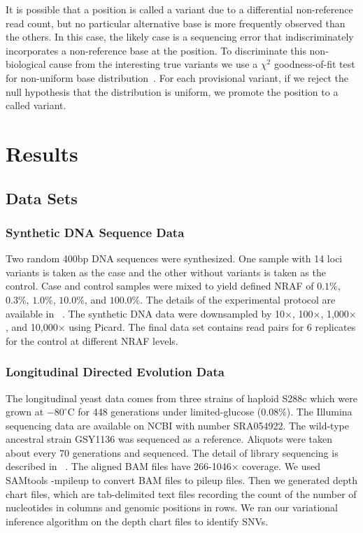 \documentclass[11pt,reqno]{amsart}
\begin{document}
It is possible that a position is called a variant due to a differential non-reference read count, but no particular alternative base is more frequently observed than the others.
In this case, the likely case is a sequencing error that indiscriminately incorporates a non-reference base at the position.
To discriminate this non-biological cause from the interesting true variants we use a $\chi^2$ goodness-of-fit test for non-uniform base distribution~\citep{efron2010large, he2015rvd2}.
For each provisional variant, if we reject the null hypothesis that the distribution is uniform, we promote the position to a called variant.


\section{Results}
\subsection{Data Sets}
\subsubsection{Synthetic DNA Sequence Data}
Two random 400bp DNA sequences were synthesized. One sample with 14 loci variants is taken as the case and the other without variants is taken as the control.
Case and control samples were mixed to yield defined NRAF of $0.1\%$, $0.3\%$, $1.0\%$, $10.0\%$, and $100.0\%$.
The details of the experimental protocol are available in ~\citep{flaherty2011ultrasensitive}.
The synthetic DNA data were downsampled by 10$\times$, 100$\times$, 1,000$\times$, and 10,000$\times$ using Picard.
The final data set contains read pairs for 6 replicates for the control at different NRAF levels.
\subsubsection{Longitudinal Directed Evolution Data}
The longitudinal yeast data comes from three strains of haploid S288c which were grown at $-80^{\circ }\textrm{C}$ for 448 generations under limited-glucose (0.08$\%$).
The Illumina sequencing data are available on NCBI with number SRA054922.
The wild-type ancestral strain GSY1136 was sequenced as a reference.
Aliquots were taken about every 70 generations and sequenced.
The detail of library sequencing is described in ~\citep{kvitek2013whole, kao2008molecular}.
The aligned BAM files have 266-1046$\times$ coverage.
We used SAMtools -mpileup to convert BAM files to pileup files.
Then we generated depth chart files, which are tab-delimited text files recording the count of the number of nucleotides in columns and genomic positions in rows.
We ran our variational inference algorithm on the depth chart files to identify SNVs.
\end{document}
